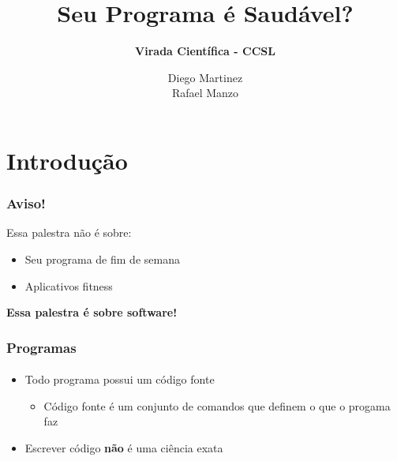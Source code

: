 \documentclass{beamer}
\title{
       \textbf{Seu Programa é Saudável?} \\
      }
\subtitle{
		\textbf{Virada Científica - CCSL}
		}
\author{Diego Martinez\\
        Rafael Manzo
       }
\begin{document}
\maketitle

\section{Introdução}

\begin{frame}
  \frametitle{Aviso!}

  Essa palestra não é sobre:
  \vspace{.75cm}
  \begin{itemize}
    \item Seu programa de fim de semana
    \vspace{.5cm}
    \item Aplicativos fitness
  \end{itemize}

  \vspace{.75cm}
  \center
  \textbf{Essa palestra é sobre software!}

\end{frame}


\begin{frame}
  \frametitle{Programas}
  \framesubtitle{}

  \begin{itemize}
    \item Todo programa possui um código fonte
    \vspace{.25cm}
    \begin{itemize}
      \item Código fonte é um conjunto de comandos que definem o que o progama faz
    \end{itemize}
    \vspace{.5cm}
    \item Escrever código \textbf{não} é uma ciência exata
  \end{itemize}

\end{frame}
\end{document}
